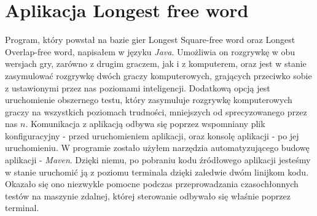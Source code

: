 \documentclass[document]{xmgr}
\begin{document}
\chapter{Aplikacja Longest free word}
Program, który powstał na bazie gier Longest Square-free word oraz Longest Overlap-free word, napisałem w języku \textit{Java}. Umożliwia on rozgrywkę w obu wersjach gry, zarówno z drugim graczem, jak i z komputerem, oraz jest w stanie zasymulować rozgrywkę dwóch graczy komputerowych, grających przeciwko sobie z ustawionymi przez nas poziomami inteligencji. Dodatkową opcją jest uruchomienie obszernego testu, który zasymuluje rozgrywkę komputerowych graczy na wszystkich poziomach trudności, mniejszych od sprecyzowanego przez nas $n$. Komunikacja z aplikacją odbywa się poprzez wspomniany plik konfiguracyjny - przed uruchomieniem aplikacji, oraz konsolę aplikacji - po jej uruchomieniu. W programie zostało użyłem narzędzia automatyzującego budowę aplikacji - \textit{Maven}. Dzięki niemu, po pobraniu kodu źródłowego aplikacji jesteśmy w stanie uruchomić ją z poziomu terminala dzięki zaledwie dwóm linijkom kodu. Okazało się ono niezwykle pomocne podczas przeprowadzania czasochłonnych testów na maszynie zdalnej, której sterowanie odbywało się właśnie poprzez terminal.
\end{document}
